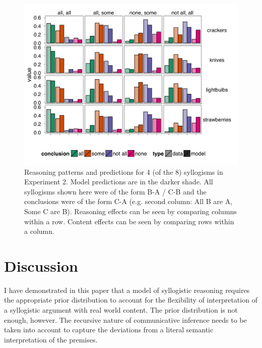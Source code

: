 \documentclass{article} %
\begin{document}
\begin{figure}
\centering
    \includegraphics[width=\columnwidth]{figures/syllogismXdomain}
    \caption{Reasoning patterns and predictions for 4 (of the 8) syllogisms in Experiment 2. Model predictions are in the darker shade. All syllogisms shown here were of the form B-A / C-B and the conclusions were of the form C-A (e.g. second column: All B are A, Some C are B). Reasoning effects can be seen by comparing columns within a row. Content effects can be seen by comparing rows within a column.}
  \label{fig:syllogismXdomain}
\end{figure}

\section{Discussion}

I have demonstrated in this paper that a model of syllogistic reasoning requires the appropriate prior distribution to account for the flexibility of interpretation of a syllogistic argument with real world content. The prior distribution is not enough, however. The recursive nature of communicative inference needs to be taken into account to capture the deviations from a literal semantic interpretation of the premises. 





\end{document}
